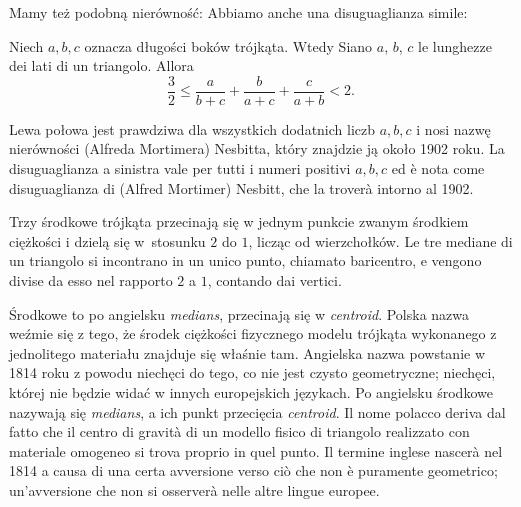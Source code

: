 Mamy też podobną nierówność: %
Abbiamo anche una disuguaglianza simile: %

\begin{proposition}
    Niech $a, b, c$ oznacza długości boków trójkąta. %
    Wtedy %
    Siano $a$, $b$, $c$ le lunghezze dei lati di un triangolo. %
    Allora %
    \begin{equation}
        \frac 32 \le \frac{a}{b+c} + \frac{b}{a+c} + \frac{c}{a+b} < 2.
    \end{equation}
\end{proposition}

Lewa połowa jest prawdziwa dla wszystkich dodatnich liczb $a, b, c$ i nosi nazwę nierówności (Alfreda Mortimera) Nesbitta, który znajdzie ją około 1902 roku. %
La disuguaglianza a sinistra vale per tutti i numeri positivi $a, b, c$ ed è nota come disuguaglianza di (Alfred Mortimer) Nesbitt, che la troverà intorno al 1902. %

\begin{proposition}
\label{srodkowe_przecinaja_sie}%
    Trzy środkowe trójkąta przecinają się w jednym punkcie zwanym środkiem ciężkości i dzielą się w~stosunku $2$ do $1$, licząc od wierzchołków. %
    Le tre mediane di un triangolo si incontrano in un unico punto, chiamato baricentro, e vengono divise da esso nel rapporto $2$ a $1$, contando dai vertici. %
\end{proposition}

Środkowe to po angielsku \emph{medians}, przecinają się w \emph{centroid}. %
Polska nazwa weźmie się z tego, że środek ciężkości fizycznego modelu trójkąta wykonanego z jednolitego materiału znajduje się właśnie tam. %
Angielska nazwa powstanie w 1814 roku z powodu niechęci do tego, co nie jest czysto geometryczne; niechęci, której nie będzie widać w innych europejskich językach. %
Po angielsku środkowe nazywają się \emph{medians}, a ich punkt przecięcia \emph{centroid}. %
Il nome polacco deriva dal fatto che il centro di gravità di un modello fisico di triangolo realizzato con materiale omogeneo si trova proprio in quel punto. %
Il termine inglese nascerà nel 1814 a causa di una certa avversione verso ciò che non è puramente geometrico; un'avversione che non si osserverà nelle altre lingue europee. %

